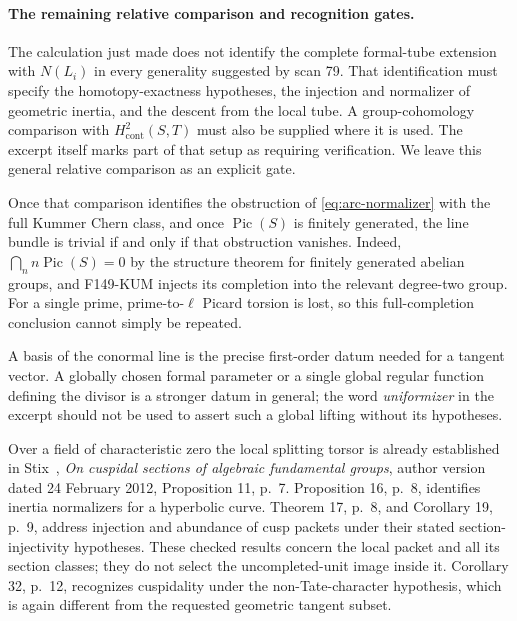 \paragraph{The remaining relative comparison and recognition gates.}
The calculation just made does not identify the complete formal-tube
extension with \(N(L_i)\) in every generality suggested by scan 79.
That identification must specify the homotopy-exactness hypotheses,
the injection and normalizer of geometric inertia, and the descent
from the local tube.  A group-cohomology comparison with
\(H^2_{\mathrm{cont}}(S,T)\) must also be supplied where it is used.
The excerpt itself marks part of that setup as requiring verification.
We leave this general relative comparison as an explicit gate.

Once that comparison identifies the obstruction of
\eqref{eq:arc-normalizer} with the full Kummer Chern class, and once
\(\operatorname{Pic}(S)\) is finitely generated, the line bundle is
trivial if and only if that obstruction vanishes.  Indeed,
\(\bigcap_n n\operatorname{Pic}(S)=0\) by the structure theorem for
finitely generated abelian groups, and F149-KUM injects its completion
into the relevant degree-two group.  For a single prime, prime-to-\(\ell\)
Picard torsion is lost, so this full-completion conclusion cannot
simply be repeated.

A basis of the conormal line is the precise first-order datum needed
for a tangent vector.  A globally chosen formal parameter or a single
global regular function defining the divisor is a stronger datum in
general; the word \emph{uniformizer} in the excerpt should not be used
to assert such a global lifting without its hypotheses.

Over a field of characteristic zero the local splitting torsor is
already established in Stix~\cite{StixCuspidal2012}, \emph{On cuspidal sections of algebraic
fundamental groups}, author version dated 24 February 2012,
Proposition 11, p.~7.  Proposition 16, p.~8, identifies inertia
normalizers for a hyperbolic curve.  Theorem 17, p.~8, and Corollary 19,
p.~9, address injection and abundance of cusp packets under their
stated section-injectivity hypotheses.  These checked results concern
the local packet and all its section classes; they do not select the
uncompleted-unit image inside it.  Corollary 32, p.~12, recognizes
cuspidality under the non-Tate-character hypothesis, which is again
different from the requested geometric tangent subset.

